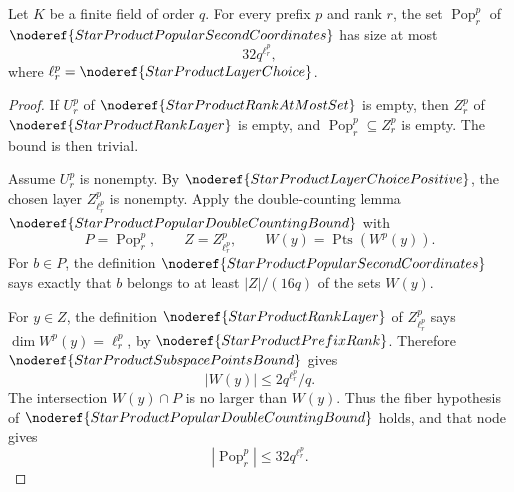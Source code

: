 \begin{helper}
Let \(K\) be a finite field of order \(q\).  For every prefix \(p\) and
rank \(r\), the set \(\operatorname{Pop}^p_r\) of
\(\noderef{StarProductPopularSecondCoordinates}\) has size at most
\[
  32q^{\ell^p_r},
\]
where \(\ell^p_r=\noderef{StarProductLayerChoice}\).
\end{helper}
\begin{proof}
If \(U^p_r\) of \(\noderef{StarProductRankAtMostSet}\) is empty, then
\(Z^p_r\) of \(\noderef{StarProductRankLayer}\) is empty, and
\(\operatorname{Pop}^p_r\subseteq Z^p_r\) is empty.  The bound is then
trivial.

Assume \(U^p_r\) is nonempty.  By
\(\noderef{StarProductLayerChoicePositive}\), the chosen layer
\(Z^p_{\ell^p_r}\) is nonempty.  Apply the double-counting lemma
\(\noderef{StarProductPopularDoubleCountingBound}\) with
\[
  P=\operatorname{Pop}^p_r,\qquad
  Z=Z^p_{\ell^p_r},\qquad
  W(y)=\operatorname{Pts}(W^p(y)).
\]
For \(b\in P\), the definition
\(\noderef{StarProductPopularSecondCoordinates}\) says exactly that \(b\)
belongs to at least \(|Z|/(16q)\) of the sets \(W(y)\).

For \(y\in Z\), the definition \(\noderef{StarProductRankLayer}\) of
\(Z^p_{\ell^p_r}\) says \(\dim W^p(y)=\ell^p_r\), by
\(\noderef{StarProductPrefixRank}\).
Therefore \(\noderef{StarProductSubspacePointsBound}\) gives
\[
  |W(y)|\le 2q^{\ell^p_r}/q.
\]
The intersection \(W(y)\cap P\) is no larger than \(W(y)\).  Thus the fiber
hypothesis of \(\noderef{StarProductPopularDoubleCountingBound}\) holds, and
that node gives
\[
  |\operatorname{Pop}^p_r|\le 32q^{\ell^p_r}.
\]
\end{proof}
